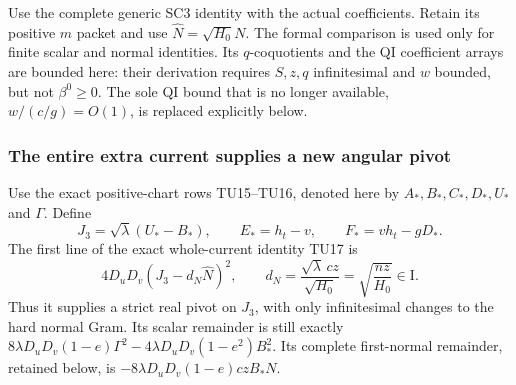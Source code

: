 Use the complete generic SC3 identity with the actual coefficients.
Retain its positive $m$ packet and use $\widehat N=\sqrt{H_0}N$.
The formal comparison is used only for finite scalar and normal
identities. Its $q$-coquotients and the QI coefficient arrays are
bounded here: their derivation requires $S,z,q$ infinitesimal and
$w$ bounded, but not $\beta^0\geq0$. The sole QI bound that is no
longer available, $w/(c/g)=O(1)$, is replaced explicitly below.

\subsubsection*{The entire extra current supplies a new angular pivot}

Use the exact positive-chart rows TU15--TU16, denoted here by
$A_*,B_*,C_*,D_*,U_*$ and $\Gamma$. Define
\[
 J_3=\sqrt\lambda(U_*-B_*),\qquad
 E_*=h_t-v,\qquad F_*=vh_t-gD_*.
                                                               \tag{UL4}
\]
The first line of the exact whole-current identity TU17 is
\[
 4D_uD_v\left(J_3-d_N\widehat N\right)^2,\qquad
 d_N=\frac{\sqrt\lambda\,cz}{\sqrt{H_0}}
       =\sqrt{\frac{nz}{H_0}}\in\mathrm I.                       \tag{UL5}
\]
Thus it supplies a strict real pivot on $J_3$, with only
infinitesimal changes to the hard normal Gram. Its scalar
remainder is still exactly
$8\lambda D_uD_v(1-e)\Gamma^2
-4\lambda D_uD_v(1-e^2)B_*^2$.
Its complete first-normal remainder, retained below, is
$-8\lambda D_uD_v(1-e)czB_*N$.

